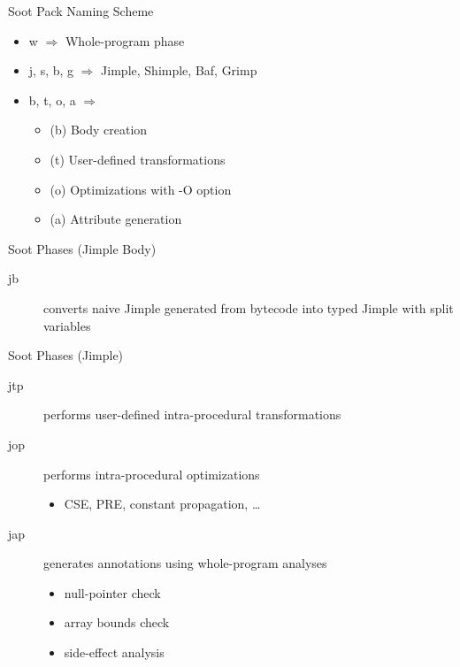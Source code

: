 

\begin{slide}{Soot Pack Naming Scheme}
\begin{itemize}
\item w $\Rightarrow$ Whole-program phase
\item j, s, b, g $\Rightarrow$ Jimple, Shimple, Baf, Grimp
\item b, t, o, a $\Rightarrow$
\begin{itemize}
\item (b) Body creation
\item (t) User-defined transformations
\item (o) Optimizations with -O option
\item (a) Attribute generation
\end{itemize}
\end{itemize}
\end{slide}


\begin{slide}{Soot Phases (Jimple Body)}
\begin{description}
\item[jb] converts naive Jimple generated from bytecode into
typed Jimple with split variables
\end{description}
\end{slide}

\begin{slide}{Soot Phases (Jimple)}
\begin{description}
\item[jtp] performs user-defined intra-procedural transformations
\item[jop] performs intra-procedural optimizations
\begin{itemize}
\item CSE, PRE, constant propagation, \ldots
\end{itemize}
\item[jap] generates annotations using whole-program analyses
\begin{itemize}
\item null-pointer check
\item array bounds check
\item side-effect analysis
\end{itemize}
\end{description}
\end{slide}

